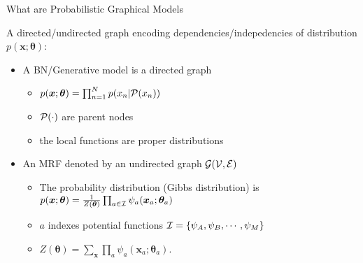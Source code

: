 \begin{frame}{What are Probabilistic Graphical Models}
  \\
  \vskip 0.8cm
  
  A directed/undirected graph encoding dependencies/indepedencies of distribution $p(\bm{x}; \bm{\theta})$:
  \begin{itemize}[label={$\bullet$}]
  \item A BN/Generative model is a directed graph
    \begin{itemize}[label={$\bullet$}]
    \item $p(\bm{x}; \bm{\theta}) = \prod_{n=1}^{N}p(x_n| \mathcal{P}(x_n))$
    \item $\mathcal{P}(\cdot)$ are parent nodes
    \item the local functions are proper distributions
    \end{itemize}
    
  \item An MRF denoted by an undirected graph $\mathcal{G}(\mathcal{V}, \mathcal{E})$
    \begin{itemize}[label=$\bullet$]
    \item The probability distribution (Gibbs distribution) is $p(\bm{x}; \bm{\theta}) = \frac{1}{Z(\bm{\theta})} \prod_{a\in\mathcal{I}} \psi_a(\bm{x}_a; \bm{\theta}_a)$
    \item  $a$ indexes potential functions $\mathcal{I}=\{\psi_A, \psi_B, \cdots, \psi_M\}$
    \item $Z(\bm{\theta}) = \sum_{\bm{x}}\prod_{a} \psi_a(\bm{x}_a;\bm{\theta}_a)$.
    \end{itemize}
  \end{itemize}
  
  
\end{frame}

